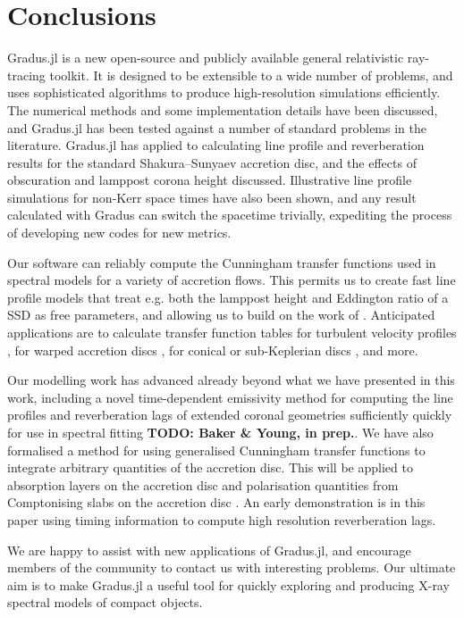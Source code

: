 \documentclass[fleqn,usenatbib]{mnras}
\newcommand{\todo}[1]{{\noindent \bf \color{red} TODO: #1}}
\newcommand{\software}[1]{{\sc #1}}
\newcommand{\Gradus}{\software{Gradus.jl}\xspace}
\begin{document}
\section{Conclusions}
\label{sec:conclusion}

\Gradus is a new open-source and publicly available general relativistic
ray-tracing toolkit. It is designed to be extensible to a wide number of
problems, and uses sophisticated algorithms to produce high-resolution
simulations efficiently. The numerical methods and some implementation details
have been discussed, and \Gradus has been tested against a number of standard
problems in the literature. \Gradus has applied to calculating line profile and
reverberation results for the standard Shakura--Sunyaev accretion disc, and the
effects of obscuration and lamppost corona height discussed. Illustrative line
profile simulations for non-Kerr space times have also been shown, and any
result calculated with Gradus can switch the spacetime trivially, expediting
the process of developing new codes for new metrics.

Our software can reliably compute the Cunningham transfer functions used in
spectral models for a variety of accretion flows. This permits us to create fast
line profile models that treat e.g. both the lamppost height and Eddington
ratio of a SSD as free parameters, and allowing us to build on the work of
\citet{jiang_black_20222}. Anticipated applications are to calculate
transfer function tables for turbulent velocity profiles
\citep{pariev_line_1998}, for warped accretion discs
\citep[e.g.][]{hartnoll_reprocessed_2001}, for conical or sub-Keplerian discs
\citep[e.g.][]{wu_iron_2007}, and more.

Our modelling work has advanced already beyond what we have presented in this
work, including a novel time-dependent emissivity method for computing the line
profiles and reverberation lags of extended coronal geometries sufficiently
quickly for use in spectral fitting \todo{Baker \& Young, in prep.}. We have
also formalised a method for using generalised Cunningham transfer functions to
integrate arbitrary quantities of the accretion disc. This will be applied to
absorption layers on the accretion disc \citep{fabian_blueshifted_2020} and
polarisation quantities from Comptonising slabs on the accretion disc
\citep[e.g.][]{poutanen_the_1996}. An early demonstration is in this paper using
timing information to compute high resolution reverberation lags.

We are happy to assist with new applications of \Gradus, and encourage members
of the community to contact us with interesting problems. Our ultimate aim is to
make \Gradus a useful tool for quickly exploring and producing X-ray spectral
models of compact objects.
\end{document}
